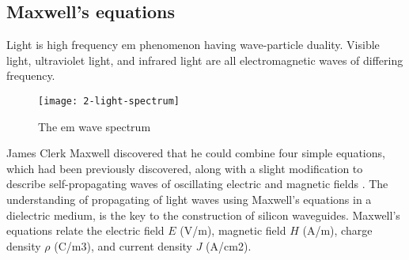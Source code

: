 \documentclass[../report.tex]{subfiles}
\begin{document}
		\subsection{Maxwell's equations}
Light is high frequency \gls{em} phenomenon having wave-particle duality. Visible light, ultraviolet light, and infrared light are all electromagnetic waves of differing frequency. 
\begin{figure}[h]
	\centering
	\texttt{[image: 2-light-spectrum]}
	\caption{The \gls{em} wave spectrum}
	\label{fig:2_light_spectrum}
\end{figure}
James Clerk Maxwell discovered that he could combine four simple equations, which had been previously discovered, along with a slight modification to describe self-propagating waves of oscillating electric and magnetic fields \cite{waveparticle_2016}. The understanding of propagating of light waves using Maxwell's equations in a dielectric medium, is the key to the construction of silicon waveguides. Maxwell’s equations relate the electric field $E$ (V/m), magnetic field $H$ (A/m), charge density $\rho$ (C/m3), and current density $J$ (A/cm2).
\end{document}
